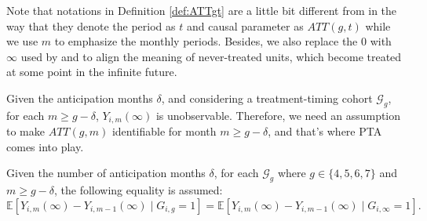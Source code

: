 Note that notations in Definition \ref{def:ATTgt} are a little bit different from \cite{callaway2021difference} in the way that they denote the period as $t$ and causal parameter as $ATT(g, t)$ while we use $m$ to emphasize the monthly periods. Besides, we also replace the 0 with $\infty$ used by \cite{sun2021estimating} and \cite{borusyak2024revisiting} to align the meaning of never-treated units, which become treated at some point in the infinite future.

Given the anticipation months $\delta$, and considering a treatment-timing cohort $\mathcal{G}_g$, for each $m \geq g-\delta$, $Y_{i, m}(\infty)$ is unobservable. Therefore, we need an assumption to make $ATT(g, m)$ identifiable for month $m \geq g-\delta$, and that's where PTA comes into play.

\begin{definition}\label{def:parallel_trend}
Given the number of anticipation months $\delta$, for each $\mathcal{G}_g$ where $g \in \{4,5,6,7\}$ and $m \geq g-\delta$, the following equality is assumed:
\begin{equation}\label{eq:parallel_trend}
\mathbb{E}[ Y_{i, m}(\infty) - Y_{i, m-1}(\infty) \mid G_{i, g} = 1]
= \mathbb{E}[ Y_{i, m}(\infty) - Y_{i, m-1}(\infty) \mid G_{i, \infty} = 1 ].
\end{equation}
\end{definition}

